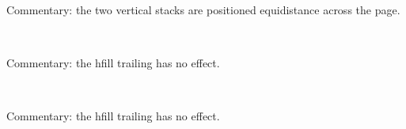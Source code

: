 
%

\hbox{
}
 
Commentary: the two vertical stacks are positioned equidistance across the page.

%


\hbox{
\hfill
}
 
Commentary: the hfill trailing has no effect.

%


\hbox{
\hfill
}
 
Commentary: the hfill trailing has no effect.

%

